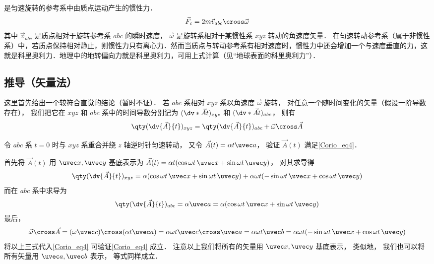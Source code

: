 
是匀速旋转的参考系中由质点运动产生的惯性力．
\begin{equation}
\vec F_c = 2m \vec v_{abc} \cross \vec \omega
\end{equation}
其中 $\vec v_{abc}$ 是质点相对于旋转参考系 $abc$ 的瞬时速度， $\vec\omega$ 是旋转系相对于某惯性系 $xyz$ 转动的角速度矢量．%
在匀速转动参考系（属于非惯性系）中，若质点保持相对静止，则惯性力只有离心力．然而当质点与转动参考系有相对速度时，惯性力中还会增加一个与速度垂直的力，这就是科里奥利力．地理中的地转偏向力就是科里奥利力，可用上式计算（见“地球表面的科里奥利力”）．

\subsection{推导（矢量法）}

这里首先给出一个较符合直觉的结论（暂时不证）． 若 $abc$ 系相对 $xyz$ 系以角速度 $\vec\omega$ 旋转， 对任意一个随时间变化的矢量（假设一阶导数存在）， 我们把它在 $xyz$ 和 $abc$ 系中的时间导数分别记为 $(\dv*{\vec A}{t})_{xyz}$ 和 $(\dv*{\vec A}{t})_{abc}$， 则有
\begin{equation}\label{Corio_eq4}
\qty(\dv{\vec A}{t})_{xyz} = \qty(\dv{\vec A}{t})_{abc} + \vec\omega\cross\vec A
\end{equation}

\begin{exam}{}
令 $abc$ 系 $t = 0$ 时与 $xyz$ 系重合并绕 $z$ 轴逆时针匀速转动， 又令 $\vec A(t) = \alpha t \uvec a$， 验证 $\vec A(t)$ 满足\autoref{Corio_eq4}．

首先将 $\vec A(t)$ 用 $\uvec x, \uvec y$ 基底表示为 $\vec A(t) = \alpha t (\cos\omega t\, \uvec x + \sin\omega t\, \uvec y)$， 对其求导得
\begin{equation}
\qty(\dv{\vec A}{t})_{xyz} = \alpha (\cos\omega t \,\uvec x + \sin\omega t \,\uvec y)
+ \alpha\omega t (-\sin\omega t \,\uvec x + \cos\omega t \,\uvec y)
\end{equation}
而在 $abc$ 系中求导为
\begin{equation}
\qty(\dv{\vec A}{t})_{abc} = \alpha \uvec a = \alpha (\cos\omega t\, \uvec x + \sin\omega t \,\uvec y)
\end{equation}
最后，
\begin{equation}
\vec\omega \cross \vec A = (\omega \uvec c) \cross (\alpha t \uvec a) = \alpha\omega t \uvec c\cross\uvec a = \alpha\omega t \uvec b = \alpha\omega t(-\sin \omega t \,\uvec x + \cos\omega t \,\uvec y)
\end{equation}
将以上三式代入\autoref{Corio_eq4} 可验证\autoref{Corio_eq4} 成立． 注意以上我们将所有的矢量用 $\uvec x, \uvec y$ 基底表示， 类似地， 我们也可以将所有矢量用 $\uvec a, \uvec b$ 表示， 等式同样成立．
\end{exam}


